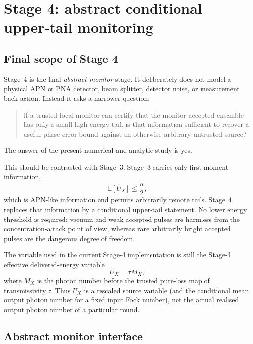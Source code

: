\documentclass[11pt]{article}
\theoremstyle{remark}
\begin{document}
\section{Stage 4: abstract conditional upper-tail monitoring}
\label{sec:stage4-rigorous}

\subsection{Final scope of Stage 4}

Stage~4 is the final \emph{abstract monitor} stage.  It deliberately does not
model a physical APN or PNA detector, beam splitter, detector noise, or
measurement back-action.  Instead it asks a narrower question:

\begin{quote}
If a trusted local monitor can certify that the monitor-accepted ensemble has
only a small high-energy tail, is that information sufficient to recover a
useful phase-error bound against an otherwise arbitrary untrusted source?
\end{quote}

The answer of the present numerical and analytic study is yes.

This should be contrasted with Stage~3.  Stage~3 carries only first-moment
information,
\begin{equation}
    \mathbb E[U_X]\le\frac{\bar n}{2},
    \label{eq:stage4-stage3-mean}
\end{equation}
which is APN-like information and permits arbitrarily remote tails.  Stage~4
replaces that information by a conditional upper-tail statement.  No lower
energy threshold is required: vacuum and weak accepted pulses are harmless
from the concentration-attack point of view, whereas rare arbitrarily bright
accepted pulses are the dangerous degree of freedom.

The variable used in the current Stage-4 implementation is still the Stage-3
effective delivered-energy variable
\begin{equation}
    U_X=\tau M_X,
    \label{eq:stage4-u-definition}
\end{equation}
where \(M_X\) is the photon number before the trusted pure-loss map of
transmissivity \(\tau\).  Thus \(U_X\) is a rescaled source variable (and the
conditional mean output photon number for a fixed input Fock number), not the
actual realised output photon number of a particular round.

\subsection{Abstract monitor interface}
\end{document}
